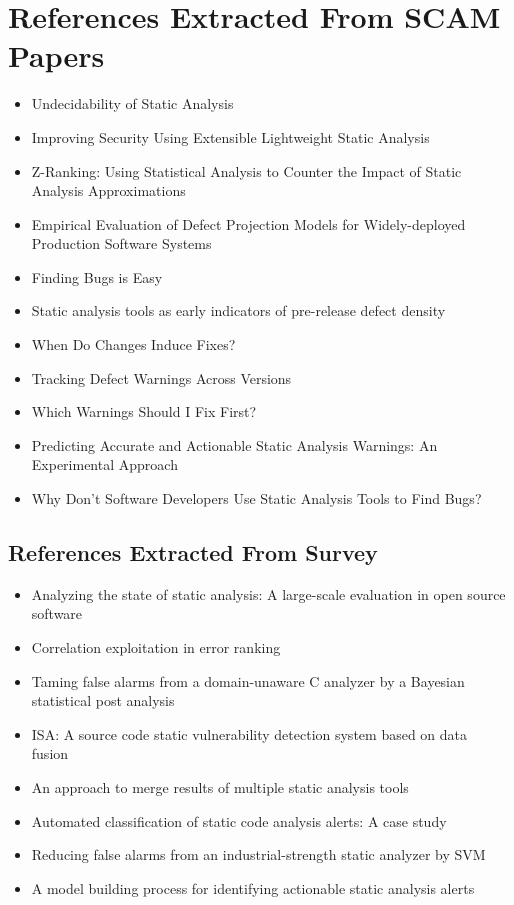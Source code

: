 \section{References Extracted From SCAM Papers}
\label{apx:sec:refs}
\begin{itemize}
\item Undecidability of Static Analysis~\cite{landi_undecidability_1992}
\item Improving Security Using Extensible Lightweight Static Analysis~\cite{evans_improving_2002}
\item Z-Ranking: Using Statistical Analysis to Counter the Impact of Static Analysis Approximations~\cite{kremenek2003z}
\item Empirical Evaluation of Defect Projection Models for Widely-deployed Production Software Systems~\cite{li2004empirical}
\item Finding Bugs is Easy~\cite{hovemeyer_finding_2004}
\item Static analysis tools as early indicators of pre-release defect density~\cite{nagappan2005static}
\item When Do Changes Induce Fixes?~\cite{sliwerski2005changes}
\item Tracking Defect Warnings Across Versions~\cite{spacco_tracking_2006}
\item Which Warnings Should I Fix First?~\cite{kim_which_2007}
\item Predicting Accurate and Actionable Static Analysis Warnings: An Experimental Approach~\cite{ruthruff_predicting_2008}
\item Why Don’t Software Developers Use Static Analysis Tools to Find Bugs?~\cite{johnson_why_2013}
\end{itemize}

\subsection{References Extracted From Survey~\cite{muske2016survey}}
\label{apx:sec:survey}
\begin{itemize}
  \item Analyzing the state of static analysis: A large-scale evaluation in open source software~\cite{beller2016analyzing}
  \item Correlation exploitation in error ranking~\cite{kremenek2004correlation}
  \item Taming false alarms from a domain-unaware C analyzer by a Bayesian statistical post analysis~\cite{jung2005taming}
  \item ISA: A source code static vulnerability detection system based on data fusion~\cite{kong2007isa}
  \item An approach to merge results of multiple static analysis tools~\cite{meng2008approach}
  \item Automated classification of static code analysis alerts: A case study~\cite{yuksel2013classification}
  \item Reducing false alarms from an industrial-strength static analyzer by SVM~\cite{yoon2014reducing}
  \item A model building process for identifying actionable static analysis alerts~\cite{heckman2009model}
\end{itemize}
